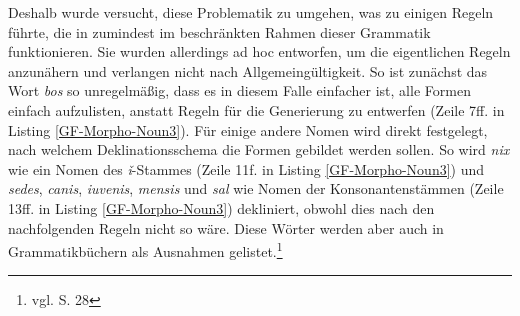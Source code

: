 Deshalb wurde versucht, diese Problematik zu umgehen, was zu einigen Regeln führte, die in zumindest im beschränkten Rahmen dieser Grammatik funktionieren. Sie wurden allerdings ad hoc entworfen, um die eigentlichen Regeln anzunähern und verlangen nicht nach Allgemeingültigkeit. So ist zunächst das Wort \textit{bos} so unregelmäßig, dass es in diesem Falle einfacher ist, alle Formen einfach aufzulisten, anstatt Regeln für die Generierung zu entwerfen (Zeile 7ff. in Listing \ref{GF-Morpho-Noun3}). Für einige andere Nomen wird direkt festgelegt, nach welchem Deklinationsschema die Formen gebildet werden sollen. So wird \textit{nix} wie ein Nomen des \textit{ǐ}-Stammes (Zeile 11f. in Listing \ref{GF-Morpho-Noun3}) und \textit{sedes}, \textit{canis}, \textit{iuvenis}, \textit{mensis} und \textit{sal} wie Nomen der Konsonantenstämmen (Zeile 13ff. in Listing \ref{GF-Morpho-Noun3}) dekliniert, obwohl dies nach den nachfolgenden Regeln nicht so wäre. Diese Wörter werden aber auch in Grammatikbüchern als Ausnahmen gelistet.\footnote{vgl. \cite{BAYER-LINDAUER1994} S. 28} \par
